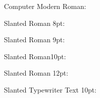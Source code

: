\documentclass[10pt,a4paper]{article}
\newcommand{\Ligature}{%

}
\begin{document}
Computer Modern Roman:\\{\Ligature}

Slanted Roman 8pt:\\{\olsleight \Ligature}

Slanted Roman 9pt:\\{\olslnine \Ligature}

Slanted Roman10pt:\\{\olslten \Ligature}

Slanted Roman 12pt:\\{\olsltwelve \Ligature}

Slanted Typewriter Text 10pt:\\{\olsltt \Ligature}
\end{document}
